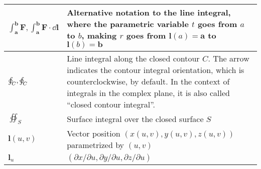 \begin{xltabular}{\textwidth}{XX}
	\(\int_\mathbf{a}^\mathbf{b} \mathbf{F}, \int_\mathbf{a}^\mathbf{b} \mathbf{F}\cdot\dd{\mathbf{l}}\)                                                                                                                                       & Alternative notation to the line integral, where the parametric variable \(t\) goes from \(a\) to \(b\), making \(r\) goes from \(\mathbf{l}(a) = \mathbf{a}\) to \(\mathbf{l}(b) = \mathbf{b}\) \cite{apostolCalculus2ndEdn1967}                                                                                                   \\ \hline
	\(\oint_C, \varointctrclockwise_C\)                                                                                                                                                                                                        & Line integral along the closed contour \(C\). The arrow indicates the contour integral orientation, which is counterclockwise, by default. In the context of integrals in the complex plane, it is also called ``closed contour integral''.                                                                                         \\ \hline
	\(\oiint_S\)                                                                                                                                                                                                                               & Surface integral over the closed surface \(S\)                                                                                                                                                                                                                                                                                      \\ \hline
	\(\mathbf{l}(u,v)\)                                                                                                                                                                                                                        & Vector position \((x(u,v), y(u,v), z(u,v))\) parametrized by \((u,v)\)                                                                                                                                                                                                                                                              \\ \hline
	\(\mathbf{l}_u\)                                                                                                                                                                                                                           & \((\partial x/ \partial u, \partial y/ \partial u, \partial z/ \partial u)\)                                                                                                                                                                                                                                                        \\ \hline

\end{xltabular}
